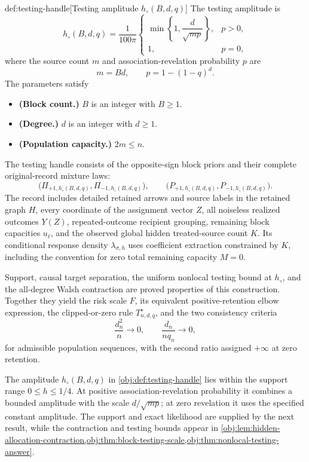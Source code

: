 \begin{definitionv}{def:testing-handle}[Testing amplitude $h_\circ(B,d,q)$]
The testing amplitude is
\[
h_\circ(B,d,q)=\frac{1}{100\pi}
\begin{cases}
\min\left\{1,\dfrac{d}{\sqrt{mp}}\right\},&p>0,\\
1,&p=0,
\end{cases}
\]
where the source count \(m\) and association-revelation probability \(p\) are
\[
m=Bd,
\qquad
p=1-(1-q)^d.
\]
The parameters satisfy
\begin{itemize}
\item \textbf{(Block count.)} \(B\) is an integer with \(B\ge1\).
\item \textbf{(Degree.)} \(d\) is an integer with \(d\ge1\).
\item \textbf{(Population capacity.)} \(2m\le n\).
\end{itemize}
The testing handle consists of the opposite-sign block priors and their complete original-record mixture laws:
\[
\bigl(\Pi_{+1,h_\circ(B,d,q)},\Pi_{-1,h_\circ(B,d,q)}\bigr),
\qquad
\bigl(P_{+1,h_\circ(B,d,q)},P_{-1,h_\circ(B,d,q)}\bigr).
\]
The record includes detailed retained arrows and source labels in the retained graph \(H\), every coordinate of the assignment vector \(Z\), all noiseless realized outcomes \(Y(Z)\), repeated-outcome recipient grouping, remaining block capacities \(u_\ell\), and the observed global hidden treated-source count \(K\). Its conditional response density \(\lambda_{\sigma,h}\) uses coefficient extraction constrained by \(K\), including the convention for zero total remaining capacity \(M=0\).

Support, causal target separation, the uniform nonlocal testing bound at \(h_\circ\), and the all-degree Walsh contraction are proved properties of this construction. Together they yield the risk scale \(F\), its equivalent positive-retention elbow expression, the clipped-or-zero rule \(T^\star_{n,d,q}\), and the two consistency criteria
\[
\frac{d_n^2}{n}\longrightarrow0,
\qquad
\frac{d_n}{nq_n}\longrightarrow0,
\]
for admissible population sequences, with the second ratio assigned \(+\infty\) at zero retention.
\end{definitionv}

The amplitude \(h_\circ(B,d,q)\) in \cref{obj:def:testing-handle} lies within the support range \(0\le h\le1/4\). At positive association-revelation probability it combines a bounded amplitude with the scale \(d/\sqrt{mp}\); at zero revelation it uses the specified constant amplitude. The support and exact likelihood are supplied by the next result, while the contraction and testing bounds appear in \cref{obj:lem:hidden-allocation-contraction,obj:thm:block-testing-scale,obj:thm:nonlocal-testing-answer}.

